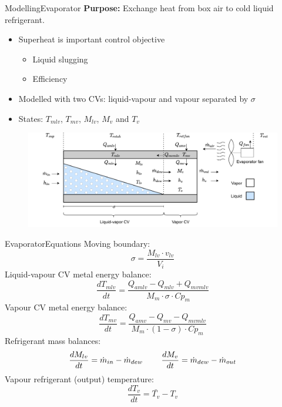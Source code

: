 
\begin{frame}{Modelling}{Evaporator}
	\textbf{Purpose:} Exchange heat from box air to cold liquid refrigerant.
	\begin{itemize}
		\item Superheat is important control objective
		\begin{itemize}
			\item Liquid slugging
			\item Efficiency
		\end{itemize}
		\item Modelled with two CVs: liquid-vapour and vapour separated by $\sigma$
		\item States: $T_{mlv}$, $T_{mv}$, $M_{lv}$, $M_{v}$ and $T_{v}$
	\end{itemize}
	
	\vspace{0.4cm}
	\begin{figure}[h!]
		\centering
		\includegraphics[width=1\textwidth]{../Graphics/Evaporator_CV_diagram.pdf}
		\label{fig:evap_CV}
	\end{figure}

\end{frame}

\begin{frame}{Evaporator}{Equations}
	Moving boundary:
	\begin{equation}
		\sigma = \frac{M_{lv} \cdot v_{lv}}{V_i} \label{eq:Evaporator_boundary}
	\end{equation}
	Liquid-vapour CV metal energy balance:
	\begin{equation}
		\frac{dT_{mlv}}{dt}  = \frac{Q_{amlv}-Q_{mlv} + Q_{mvmlv}}{M_m \cdot \sigma \cdot Cp_m} \label{eq:evap_dT_ml}
	\end{equation}
	Vapour CV metal energy balance:
	\begin{equation}
		\frac{dT_{mv}}{dt} = \frac{Q_{amv} - Q_{mv} - Q_{mvmlv}}{M_m \cdot (1 - \sigma) \cdot Cp_m} \label{eq:evap_dT_mv}
	\end{equation}
	Refrigerant mass balances:
	\begin{equation} \label{eq:evap_dMlv}
		\frac{dM_{lv}}{dt} = \dot{m}_{in} - \dot{m}_{dew} \hspace{0.8cm}  \frac{dM_v}{dt} = \dot{m}_{dew} - \dot{m}_{out}
	\end{equation}
	Vapour refrigerant (output) temperature:
	\begin{equation}\label{eq:tv_initial}
		\frac{dT_{v}}{dt} = \bar{T_v} - T_v
	\end{equation}

\end{frame}

